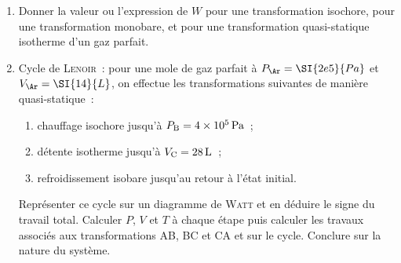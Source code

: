 \documentclass[a4paper, 10pt, final, garamond]{book}
\begin{document}
\begin{enumerate}[label=\sqenumi]
	\item Donner la valeur ou l'expression de $W$ pour une
	      transformation isochore, pour une transformation monobare, et pour une
	      transformation quasi-statique isotherme d'un gaz parfait.

	\item Cycle de \textsc{Lenoir}~: pour une mole de gaz parfait à $P_\Ar =
		      \SI{2e5}{Pa}$ et $V_\Ar = \SI{14}{L}$, on effectue les transformations
	      suivantes de manière quasi-statique~:
	      \begin{enumerate}[label=\alph*)]
		      \item chauffage isochore jusqu'à $P_{\rm B} = \SI{4e5}{Pa}$~;
		      \item détente isotherme jusqu'à $V_{\rm C} = \SI{28}{L}$~;
		      \item refroidissement isobare jusqu'au retour à l'état initial.
	      \end{enumerate}
	      Représenter ce cycle sur un diagramme de \textsc{Watt} et en déduire le
	      signe du travail total. Calculer $P$, $V$ et $T$ à chaque étape puis
	      calculer les travaux associés aux transformations AB, BC et CA et sur le
	      cycle. Conclure sur la nature du système.
\end{enumerate}
\end{document}
